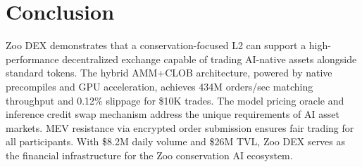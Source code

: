 \section{Conclusion}


Zoo DEX demonstrates that a conservation-focused L2 can support a high-performance decentralized exchange capable of trading AI-native assets alongside standard tokens. The hybrid AMM+CLOB architecture, powered by native precompiles and GPU acceleration, achieves 434M orders/sec matching throughput and 0.12\% slippage for \$10K trades. The model pricing oracle and inference credit swap mechanism address the unique requirements of AI asset markets. MEV resistance via encrypted order submission ensures fair trading for all participants. With \$8.2M daily volume and \$26M TVL, Zoo DEX serves as the financial infrastructure for the Zoo conservation AI ecosystem.

